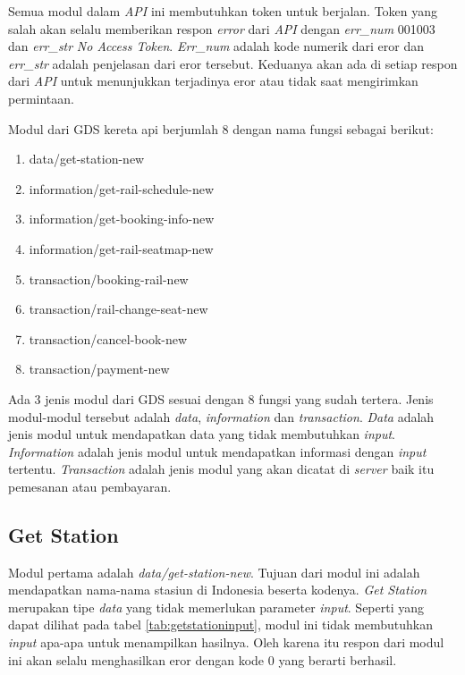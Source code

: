 Semua modul dalam \textit{API} ini membutuhkan token untuk berjalan. Token yang salah akan selalu memberikan respon \textit{error} dari \textit{API} dengan \textit{err\_num} 001003 dan \textit{err\_str} \textit{No Access Token}. \textit{Err\_num} adalah kode numerik dari eror dan \textit{err\_str} adalah penjelasan dari eror tersebut. Keduanya akan ada di setiap respon dari \textit{API} untuk menunjukkan terjadinya eror atau tidak saat mengirimkan permintaan.

Modul dari GDS kereta api berjumlah 8 dengan nama fungsi sebagai berikut:

\begin{enumerate}
	\item data/get-station-new
	\item information/get-rail-schedule-new
	\item information/get-booking-info-new
	\item information/get-rail-seatmap-new
	\item transaction/booking-rail-new
	\item transaction/rail-change-seat-new
	\item transaction/cancel-book-new
	\item transaction/payment-new

\end{enumerate}

Ada 3 jenis modul dari GDS sesuai dengan 8 fungsi yang sudah tertera. Jenis modul-modul tersebut adalah \textit{data}, \textit{information} dan \textit{transaction}. \textit{Data} adalah jenis modul untuk mendapatkan data yang tidak membutuhkan \textit{input}. \textit{Information} adalah jenis modul untuk mendapatkan informasi dengan \textit{input} tertentu. \textit{Transaction} adalah jenis modul yang akan dicatat di \textit{server} baik itu pemesanan atau pembayaran.

\subsection{Get Station}
\label{subsec:getstation}

Modul pertama adalah \textit{data/get-station-new}. Tujuan dari modul ini adalah mendapatkan nama-nama stasiun di Indonesia beserta kodenya. \textit{Get Station} merupakan tipe \textit{data} yang tidak memerlukan parameter \textit{input}. Seperti yang dapat dilihat pada tabel \ref{tab:getstationinput}, modul ini tidak membutuhkan \textit{input} apa-apa untuk menampilkan hasilnya. Oleh karena itu respon dari modul ini akan selalu menghasilkan eror dengan kode 0 yang berarti berhasil.


